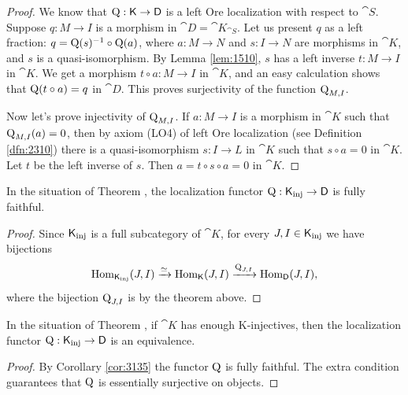 \begin{proof}
We know that $\operatorname{Q} : \operatorname{\mathsf{K}} \to \operatorname{\mathsf{D}}$ is a left Ore localization with 
respect to $\cat{S}$. 
Suppose $q : M \to I$ is a morphism in $\cat{D} = \cat{K}_{\cat{S}}$.
Let us present $q$ as a left fraction: 
$q = \operatorname{Q}(s)^{-1} \circ \operatorname{Q}(a)$, 
where $a : M \to N$ and $s : I \to N$ are morphisms in 
$\cat{K}$, and $s$ is a quasi-isomorphism. 
By Lemma \ref{lem:1510}, $s$ has a left inverse 
$t : M \to I$ in $\cat{K}$. We get a morphism 
$t \circ a : M \to I$ in $\cat{K}$, and an easy calculation shows that
$\operatorname{Q}(t \circ a) = q$ in $\cat{D}$.
This proves surjectivity of the function $\operatorname{Q}_{M, I}$.

Now let's prove injectivity of $\operatorname{Q}_{M, I}$.  
If $a : M \to I$ is a morphism in $\cat{K}$ such that 
$\operatorname{Q}_{M, I}(a) = 0$, then by axiom (LO4) of left Ore localization (see 
Definition \ref{dfn:2310}) there is a quasi-isomorphism $s : I \to L$ in 
$\cat{K}$ such that $s \circ a = 0$ in $\cat{K}$. Let $t$ be the left inverse 
of 
$s$. Then $a = t \circ s \circ a= 0$ in $\cat{K}$. 
\end{proof}

\begin{cor} \label{cor:3135}
In the situation of Theorem \tup{\ref{thm:3135}}, 
the localization functor 
$\operatorname{Q} : \operatorname{\mathsf{K}}_{\mathrm{inj}} \to \operatorname{\mathsf{D}}$ 
is fully faithful.
\end{cor}

\begin{proof}
Since $\operatorname{\mathsf{K}}_{\mathrm{inj}}$ is a full subcategory of 
$\cat{K}$, for every $J, I \in \operatorname{\mathsf{K}}_{\mathrm{inj}}$
we have bijections
\[ \operatorname{Hom}_{\operatorname{\mathsf{K}}_{\mathrm{inj}}}(J, I) \xrightarrow{\simeq} \operatorname{Hom}_{\operatorname{\mathsf{K}}}(J, I) 
\xrightarrow{\operatorname{Q}_{J, I}} \operatorname{Hom}_{\operatorname{\mathsf{D}}}(J, I) , \]
where the bijection $\operatorname{Q}_{J, I}$ is by the theorem above. 
\end{proof}

\begin{cor} \label{cor:1515}
In the situation of Theorem \tup{\ref{thm:3135}}, if
$\cat{K}$ has enough K-injectives, then the localization functor
$\operatorname{Q} : \operatorname{\mathsf{K}}_{\mathrm{inj}} \to \operatorname{\mathsf{D}}$
is an equivalence.
\end{cor}

\begin{proof}
By Corollary \ref{cor:3135} the functor $\operatorname{Q}$ is fully faithful. The 
extra condition guarantees that $\operatorname{Q}$ is essentially surjective on objects. 
\end{proof}

